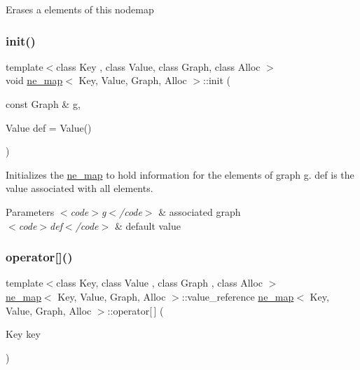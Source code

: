 Erases a elements of this nodemap \mbox{\label{classne__map_a4ef2ab4aebcb57a7a101975bf6a88e24}} 
\subsubsection{\texorpdfstring{init()}{init()}}
{\footnotesize\ttfamily template$<$class Key , class Value, class Graph, class Alloc $>$ \\
void \mbox{\hyperlink{classne__map}{ne\+\_\+map}}$<$ Key, Value, Graph, Alloc $>$\+::init (\begin{DoxyParamCaption}\item[{const Graph \&}]{g,  }\item[{Value}]{def = {\ttfamily Value()} }\end{DoxyParamCaption})}

Initializes the \mbox{\hyperlink{classne__map}{ne\+\_\+map}} to hold information for the elements of graph g. def is the value associated with all elements.


\begin{DoxyParams}{Parameters}
{\em $<$code$>$g$<$/code$>$} & associated {\ttfamily graph} \\
\hline
{\em $<$code$>$def$<$/code$>$} & default value \\
\hline
\end{DoxyParams}
\mbox{\label{classne__map_a4bcfa7ec2dcbfaa42fab93dfa81e8ab0}} 
\subsubsection{\texorpdfstring{operator[]()}{operator[]()}\hspace{0.1cm}{\footnotesize\ttfamily [1/2]}}
{\footnotesize\ttfamily template$<$class Key, class Value , class Graph , class Alloc $>$ \\
\mbox{\hyperlink{classne__map}{ne\+\_\+map}}$<$ Key, Value, Graph, Alloc $>$\+::value\+\_\+reference \mbox{\hyperlink{classne__map}{ne\+\_\+map}}$<$ Key, Value, Graph, Alloc $>$\+::operator\mbox{[}$\,$\mbox{]} (\begin{DoxyParamCaption}\item[{Key}]{key }\end{DoxyParamCaption})}

